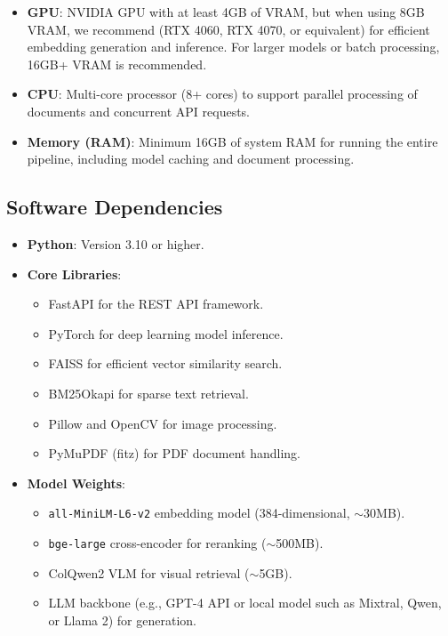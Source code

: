 \begin{itemize}
    \item \textbf{GPU}: NVIDIA GPU with at least 4GB of VRAM, but when using 8GB VRAM, we recommend (RTX 4060, RTX 4070, or equivalent) for efficient embedding generation and inference. For larger models or batch processing, 16GB+ VRAM is recommended.
    \item \textbf{CPU}: Multi-core processor (8+ cores) to support parallel processing of documents and concurrent API requests.
    \item \textbf{Memory (RAM)}: Minimum 16GB of system RAM for running the entire pipeline, including model caching and document processing.
\end{itemize}

\subsection{Software Dependencies}

\begin{itemize}
    \item \textbf{Python}: Version 3.10 or higher.
    \item \textbf{Core Libraries}:
    \begin{itemize}
        \item FastAPI for the REST API framework.
        \item PyTorch for deep learning model inference.
        \item FAISS for efficient vector similarity search.
        \item BM25Okapi for sparse text retrieval.
        \item Pillow and OpenCV for image processing.
        \item PyMuPDF (fitz) for PDF document handling.
    \end{itemize}
    \item \textbf{Model Weights}:
    \begin{itemize}
        \item \texttt{all-MiniLM-L6-v2} embedding model (384-dimensional, $\sim$30MB).
        \item \texttt{bge-large} cross-encoder for reranking ($\sim$500MB).
        \item ColQwen2 VLM for visual retrieval ($\sim$5GB).
        \item LLM backbone (e.g., GPT-4 API or local model such as Mixtral, Qwen, or Llama 2) for generation.
    \end{itemize}
\end{itemize}


